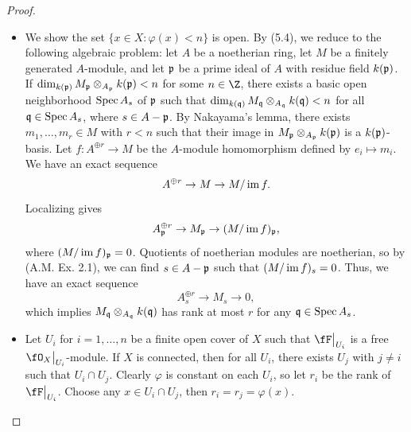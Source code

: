 \documentclass[a4paper]{article}
\begin{document}
\begin{enumerate} [label=\textbf{\arabic*.}, leftmargin=0em]
\begin{proof} $ $ \vspace{0pt}
    \begin{itemize} [leftmargin=0cm]
        \item[(a)] We show the set $\{ x \in X : \varphi(x) < n \}$ is open.  By (5.4), we reduce to the following algebraic problem: let $A$ be a noetherian ring, let $M$ be a finitely generated $A$-module, and let $\mathfrak{p}$ be a prime ideal of $A$ with residue field $k(\mathfrak{p})$. If $\dim_{k(\mathfrak{p})} M_{\mathfrak{p}} \otimes_{A_{\mathfrak{p}}} k(\mathfrak{p}) < n$ for some $n \in \Z$, there exists a basic open neighborhood $\operatorname{Spec}{A_s}$ of $\mathfrak{p}$ such that $\dim_{k(\mathfrak{q})} M_{\mathfrak{q}} \otimes_{A_{\mathfrak{q}}} k(\mathfrak{q}) < n$ for all $\mathfrak{q} \in \operatorname{Spec}{A_s}$, where $s \in A - \mathfrak{p}$. By Nakayama's lemma, there exists $m_1, \dots, m_r \in M$ with $r < n$ such that their image in $M_{\mathfrak{p}} \otimes_{A_{\mathfrak{p}}} k(\mathfrak{p})$ is a $k(\mathfrak{p})$-basis. Let $f : A^{\oplus r} \to M$ be the $A$-module homomorphism defined by $e_i \mapsto m_i$. We have an exact sequence
        \begin{equation*}
            A^{\oplus r} \to M \to M / \operatorname{im}{f}.
        \end{equation*}
        Localizing gives
        \begin{equation*}
            A_{\mathfrak{p}}^{\oplus r} \to M_{\mathfrak{p}} \to (M / \operatorname{im}{f})_{\mathfrak{p}},
        \end{equation*}
        where $(M / \operatorname{im}{f})_{\mathfrak{p}} = 0$. Quotients of noetherian modules are noetherian, so by (A.M. Ex. 2.1), we can find $s \in A - \mathfrak{p}$ such that $(M / \operatorname{im}{f})_s = 0$. Thus, we have an exact sequence
        \begin{equation*}
            A_s^{\oplus r} \to M_s \to 0,
        \end{equation*}
        which implies $M_{\mathfrak{q}} \otimes_{A_{\mathfrak{q}}} k(\mathfrak{q})$ has rank at most $r$ for any $\mathfrak{q} \in \operatorname{Spec}{A_s}$.

        \item[(b)] Let $U_i$ for $i = 1, \dots, n$ be a finite open cover of $X$ such that $\restr{\fF}{U_i}$ is a free $\restr{\fO_X}{U_i}$-module. If $X$ is connected, then for all $U_i$, there exists $U_j$ with $j \neq i$ such that $U_i \cap U_j$. Clearly $\varphi$ is constant on each $U_i$, so let $r_i$ be the rank of $\restr{\fF}{U_i}$. Choose any $x \in U_i \cap U_j$, then $r_i = r_j = \varphi(x)$.


\end{itemize}
\end{proof}
\end{enumerate}
\end{document}
